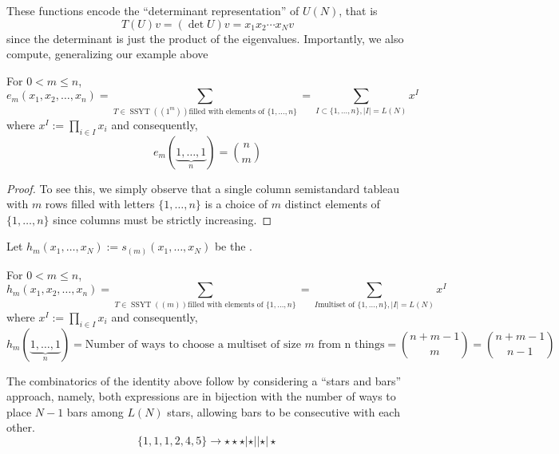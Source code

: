 \documentclass[11pt,leqno,oneside]{amsart}
\numberwithin{thm}{section}
\DeclareMathOperator{\SSYT}{SSYT}
\begin{document}
These functions encode the ``determinant representation'' of \(U(N)\),
that is \[
  T(U)v = (\det U)v = x_1 x_2 \cdots x_N v
\]
since the determinant is just the product of the
eigenvalues. Importantly, we also compute, generalizing our example
above
\begin{prop}
  For \(0 < m \leq n\), 
  \[
    e_m(x_1, x_2, \ldots, x_n) = \sum_{T \in \SSYT((1^m)) \text{
        filled with elements of }\{1,\ldots,n\}} = \sum_{I \subset
      \{1, \ldots, n\}, |I| = L(N)} x^I
  \]
  where \(x^I := \prod_{i \in I} x_i\) and consequently, \[
    e_m(\underbrace{1, \ldots, 1}_{n}) = \binom{n}{m}
  \]
\end{prop}
\begin{proof}
  To see this, we simply observe that a single column semistandard
  tableau with \(m\) rows filled with letters \(\{1,\ldots,n\}\) is a
  choice of \(m\) distinct elements of \(\{1,\ldots,n\}\) since
  columns must be strictly increasing. 
\end{proof}
\begin{defn}
  Let \(h_m(x_1, \ldots, x_N) := s_{(m)}(x_1, \ldots, x_N)\) be the
  .
\end{defn}
\begin{prop}
  For \(0 < m \leq n\), 
  \[
    h_m(x_1, x_2, \ldots, x_n) = \sum_{T \in \SSYT((m)) \text{
        filled with elements of }\{1,\ldots,n\}} = \sum_{I \text{
        multiset of }
      \{1, \ldots, n\}, |I| = L(N)} x^I
  \]
  where \(x^I := \prod_{i \in I} x_i\) and consequently, \[
    h_m(\underbrace{1, \ldots, 1}_n) = \text{Number of ways to choose
      a multiset of size } m \text{ from n things} = \binom{n+m-1}{m}
    = \binom{n+m-1}{n-1}
  \]
\end{prop}
\begin{rmk}
  The combinatorics of the identity above follow by considering a
  ``stars and bars'' approach, namely, both expressions are in
  bijection with the number of ways to place \(N-1\) bars among
  \(L(N)\) 
  stars, allowing bars to be consecutive with each other. \[
    \{1,1,1,2,4,5\} \to \star \star \star | \star || \star | \star
  \]
\end{rmk}
\end{document}
